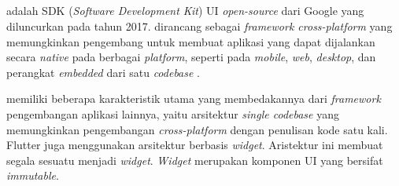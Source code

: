 \subsection{\flutter}
\label{subsec:flutter}

\flutter{} adalah SDK (\emph{Software Development Kit}) UI \emph{open-source} dari Google yang diluncurkan pada tahun 2017. \flutter{} dirancang sebagai \emph{framework cross-platform} yang memungkinkan pengembang untuk membuat aplikasi yang dapat dijalankan secara \emph{native} pada berbagai \emph{platform}, seperti pada \emph{mobile}, \emph{web}, \emph{desktop}, dan perangkat \emph{embedded} dari satu \emph{codebase} \parencite{flutter2021}.

\flutter{} memiliki beberapa karakteristik utama yang membedakannya dari \emph{framework} pengembangan aplikasi lainnya, yaitu arsitektur \emph{single codebase} yang memungkinkan pengembangan \emph{cross-platform} dengan penulisan kode satu kali. Flutter juga menggunakan arsitektur berbasis \emph{widget}. Aristektur ini membuat segala sesuatu menjadi \emph{widget}. \emph{Widget} merupakan komponen UI yang bersifat \emph{immutable}. 




